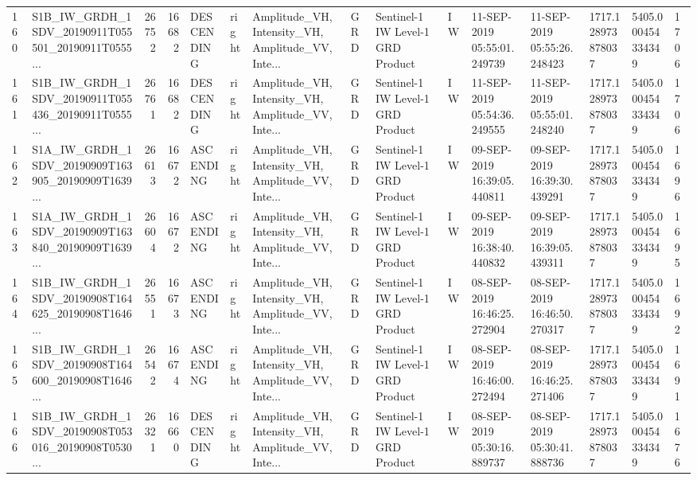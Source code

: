 \begin{tabular}{llrrlllllllllll}
160 &  S1B\_IW\_GRDH\_1SDV\_20190911T055501\_20190911T0555... &  26752 &   16682 &  DESCENDING &  right &  Amplitude\_VH, Intensity\_VH, Amplitude\_VV, Inte... &          GRD &  Sentinel-1 IW Level-1 GRD Product &              IW &  11-SEP-2019 05:55:01.249739 &  11-SEP-2019 05:55:26.248423 &          1717.128973878037 &  5405.000454334349 &       1706 \\
161 &  S1B\_IW\_GRDH\_1SDV\_20190911T055436\_20190911T0555... &  26761 &   16682 &  DESCENDING &  right &  Amplitude\_VH, Intensity\_VH, Amplitude\_VV, Inte... &          GRD &  Sentinel-1 IW Level-1 GRD Product &              IW &  11-SEP-2019 05:54:36.249555 &  11-SEP-2019 05:55:01.248240 &          1717.128973878037 &  5405.000454334349 &       1706 \\
162 &  S1A\_IW\_GRDH\_1SDV\_20190909T163905\_20190909T1639... &  26613 &   16672 &   ASCENDING &  right &  Amplitude\_VH, Intensity\_VH, Amplitude\_VV, Inte... &          GRD &  Sentinel-1 IW Level-1 GRD Product &              IW &  09-SEP-2019 16:39:05.440811 &  09-SEP-2019 16:39:30.439291 &          1717.128973878037 &  5405.000454334349 &       1696 \\
163 &  S1A\_IW\_GRDH\_1SDV\_20190909T163840\_20190909T1639... &  26604 &   16672 &   ASCENDING &  right &  Amplitude\_VH, Intensity\_VH, Amplitude\_VV, Inte... &          GRD &  Sentinel-1 IW Level-1 GRD Product &              IW &  09-SEP-2019 16:38:40.440832 &  09-SEP-2019 16:39:05.439311 &          1717.128973878037 &  5405.000454334349 &       1695 \\
164 &  S1B\_IW\_GRDH\_1SDV\_20190908T164625\_20190908T1646... &  26551 &   16673 &   ASCENDING &  right &  Amplitude\_VH, Intensity\_VH, Amplitude\_VV, Inte... &          GRD &  Sentinel-1 IW Level-1 GRD Product &              IW &  08-SEP-2019 16:46:25.272904 &  08-SEP-2019 16:46:50.270317 &          1717.128973878037 &  5405.000454334349 &       1692 \\
165 &  S1B\_IW\_GRDH\_1SDV\_20190908T164600\_20190908T1646... &  26542 &   16674 &   ASCENDING &  right &  Amplitude\_VH, Intensity\_VH, Amplitude\_VV, Inte... &          GRD &  Sentinel-1 IW Level-1 GRD Product &              IW &  08-SEP-2019 16:46:00.272494 &  08-SEP-2019 16:46:25.271406 &          1717.128973878037 &  5405.000454334349 &       1691 \\
166 &  S1B\_IW\_GRDH\_1SDV\_20190908T053016\_20190908T0530... &  26321 &   16660 &  DESCENDING &  right &  Amplitude\_VH, Intensity\_VH, Amplitude\_VV, Inte... &          GRD &  Sentinel-1 IW Level-1 GRD Product &              IW &  08-SEP-2019 05:30:16.889737 &  08-SEP-2019 05:30:41.888736 &          1717.128973878037 &  5405.000454334349 &       1676 \\

\end{tabular}
